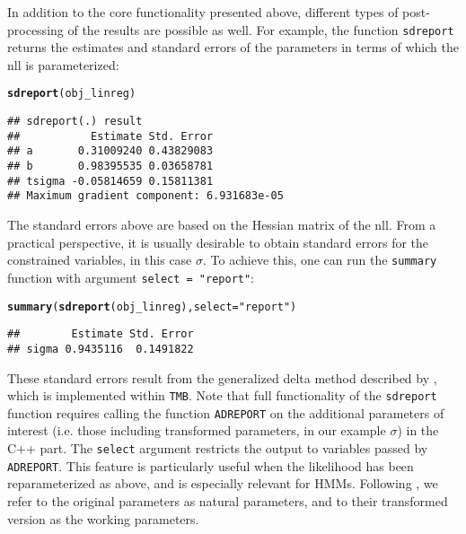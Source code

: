 \documentclass[bimj,fleqn]{w-art}\usepackage[]{graphicx}\usepackage[]{color}
\makeatletter
\newcommand{\hlstr}[1]{\textcolor[rgb]{0.192,0.494,0.8}{#1}}%
\newcommand{\hlstd}[1]{\textcolor[rgb]{0.345,0.345,0.345}{#1}}%
\newcommand{\hlkwc}[1]{\textcolor[rgb]{0.333,0.667,0.333}{#1}}%
\newcommand{\hlkwd}[1]{\textcolor[rgb]{0.737,0.353,0.396}{\textbf{#1}}}%
\newenvironment{kframe}{%
 \def\at@end@of@kframe{}%
 \ifinner\ifhmode%
  \def\at@end@of@kframe{\end{minipage}}%
  \begin{minipage}{\columnwidth}%
 \fi\fi%
 \def\FrameCommand##1{\hskip\@totalleftmargin \hskip-\fboxsep
 \colorbox{shadecolor}{##1}\hskip-\fboxsep
     \hskip-\linewidth \hskip-\@totalleftmargin \hskip\columnwidth}%
 \MakeFramed {\advance\hsize-\width
   \@totalleftmargin\z@ \linewidth\hsize
   \@setminipage}}%
 {\par\unskip\endMakeFramed%
 \at@end@of@kframe}
\newenvironment{knitrout}{}{} %
\theoremstyle{plain}
\theoremstyle{definition}
\makeatother
\begin{document}
In addition to the core functionality presented above, different types of post-processing of the results are possible as well. For example, the function \texttt{sdreport} returns the estimates and standard errors of the parameters in terms of which the nll is parameterized:
\begin{knitrout}
\color{fgcolor}\begin{kframe}
\begin{alltt}
\hlkwd{sdreport}\hlstd{(obj_linreg)}
\end{alltt}
\begin{verbatim}
## sdreport(.) result
##           Estimate Std. Error
## a       0.31009240 0.43829083
## b       0.98395535 0.03658781
## tsigma -0.05814659 0.15811381
## Maximum gradient component: 6.931683e-05
\end{verbatim}
\end{kframe}
\end{knitrout}
The standard errors above are based on the Hessian matrix of the nll.
From a practical perspective, it is usually desirable to obtain standard errors for the constrained variables, in this case $\sigma$. To achieve this, one can run the \texttt{summary} function with argument \texttt{select = "report"}:
\begin{knitrout}
\color{fgcolor}\begin{kframe}
\begin{alltt}
\hlkwd{summary}\hlstd{(}\hlkwd{sdreport}\hlstd{(obj_linreg),} \hlkwc{select} \hlstd{=} \hlstr{"report"}\hlstd{)}
\end{alltt}
\begin{verbatim}
##        Estimate Std. Error
## sigma 0.9435116  0.1491822
\end{verbatim}
\end{kframe}
\end{knitrout}
These standard errors result from the generalized delta method described by \citet{kass}, which is implemented within {\tt{TMB}}. Note that full functionality of the \texttt{sdreport} function requires calling the function \texttt{ADREPORT} on the additional parameters of interest (i.e. those including transformed parameters, in our example $\sigma$) in the C++ part.
The \texttt{select} argument restricts the output to variables passed by \texttt{ADREPORT}.
This feature is particularly useful when the likelihood has been reparameterized as above, and is especially relevant for HMMs.
Following \citet{zucchini}, we refer to the original parameters as natural parameters, and to their transformed version as the working parameters.\\
\end{document}
